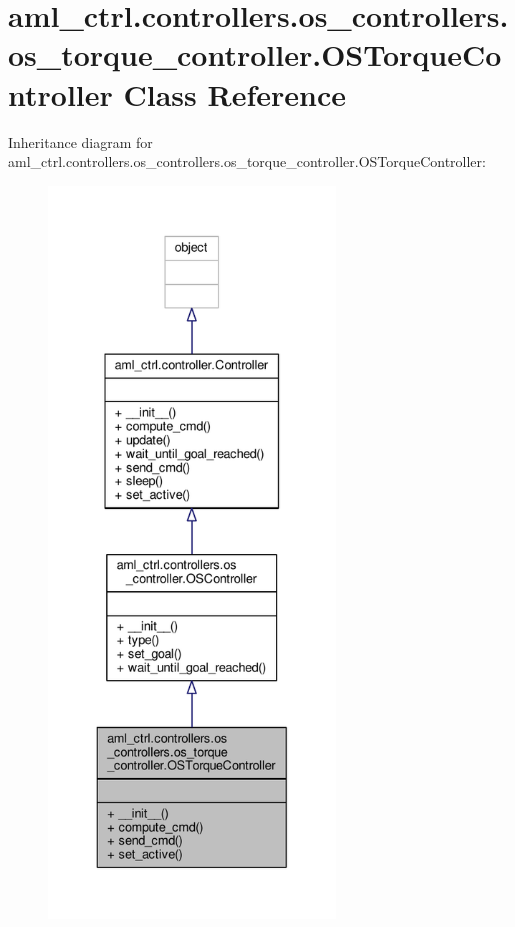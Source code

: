 \hypertarget{classaml__ctrl_1_1controllers_1_1os__controllers_1_1os__torque__controller_1_1_o_s_torque_controller}{\section{aml\-\_\-ctrl.\-controllers.\-os\-\_\-controllers.\-os\-\_\-torque\-\_\-controller.\-O\-S\-Torque\-Controller Class Reference}
\label{classaml__ctrl_1_1controllers_1_1os__controllers_1_1os__torque__controller_1_1_o_s_torque_controller}
}


Inheritance diagram for aml\-\_\-ctrl.\-controllers.\-os\-\_\-controllers.\-os\-\_\-torque\-\_\-controller.\-O\-S\-Torque\-Controller\-:\nopagebreak
\begin{figure}[H]
\begin{center}
\leavevmode
\includegraphics[height=550pt]{classaml__ctrl_1_1controllers_1_1os__controllers_1_1os__torque__controller_1_1_o_s_torque_controller__inherit__graph}
\end{center}
\end{figure}


